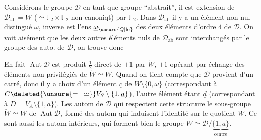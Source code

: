 
Considérons le groupe $\mathcal D$ en tant que groupe ``abstrait'', il est  extension de $\mathcal D_{\mathrm{ab}}=W$ ($\simeq\mathbb F_2\times\mathbb F_2$ non canoniqt) par $\mathbb F_2$. Dans $\mathcal D_{\mathrm{ab}}$ il y a un élément non nul distingué $\overline\omega$,   inverse est l'ens $\underline\omega_{\unsure{Q|\mathrm{le}}}$ des deux éléments d'ordre $4$ de $\mathcal D$. On voit aisément que les deux autres éléments  nuls de $\mathcal D_{\mathrm{ab}}$ sont interchangés par le groupe des auto. de $\mathcal D$, on trouve donc


En fait $\operatorname{Aut}\mathcal D$ est produit $\frac12$ direct de $\pm1$ par $\check W$, $\pm1$ opérant par échange des  éléments non  privilégiés de $\check W\simeq W$. Quand on tient compte que $\mathcal D$ provient d'un carré, donc il y a choix d'un élément $\underline c$ de $W\setminus\{0,\overline\omega\}$ (correspondant  à $C\deleted{\unsure{=|\simeq}}V_S\setminus\{1,\underline a\}$), l'autre élément étant $\underline d$ (correspondant à $D=V_A\setminus\{1,\underline a\}$). Les autom de $\mathcal D$ qui respectent cette structure  le sous-groupe $\check W\simeq W$ de $\operatorname{Aut}\mathcal D$, formé des autom  qui induisent l'identité sur le quotient $W$. Ce sont aussi les autom intérieurs, qui forment bien le groupe $W\simeq\mathcal D/\underbrace{\{1,a\}}_{\text{centre}}$.

